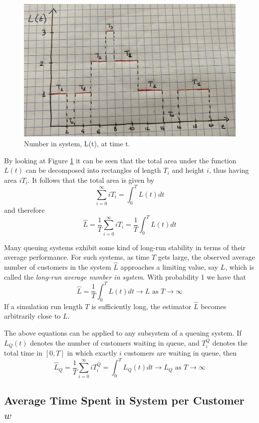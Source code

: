 \documentclass[
]{book}
\begin{document}
\begin{figure}

{\centering \includegraphics[width=0.9\linewidth]{images/system} 

}

\caption{Number in system, L(t), at time t.}\label{fig:system}
\end{figure}

By looking at Figure \ref{fig:system} it can be seen that the total area under the function \(L(t)\) can be decomposed into rectangles of length \(T_i\) and height \(i\), thus having area \(iT_i\). It follows that the total area is given by \[
\sum_{i=0}^{\infty}iT_i = \int_0^TL(t)dt
\]
and therefore
\[
\hat{L}= \frac{1}{T}\sum_{i=0}^{\infty}iT_i=\frac{1}{T}\int_{0}^TL(t)dt
\]

Many queuing systems exhibit some kind of long-run stability in terms of their average performance. For such systems, as time \(T\) gets large, the observed average number of customers in the system \(\hat{L}\) approaches a limiting value, say \(L\), which is called the \emph{long-run average number in system}. With probability 1 we have that
\[
\hat{L}=\frac{1}{T}\int_{0}^TL(t)dt \rightarrow L \mbox{ as } T \rightarrow \infty
\]
If a simulation run length \(T\) is sufficiently long, the estimator \(\hat{L}\) becomes arbitrarily close to \(L\).

The above equations can be applied to any subsystem of a queuing system. If \(L_Q(t)\) denotes the number of customers waiting in queue, and \(T_i^Q\) denotes the total time in \([0,T]\) in which exactly \(i\) customers are waiting in queue, then
\[
\hat{L}_Q=\frac{1}{T}\sum_{i=0}^{\infty}iT_i^Q=\int_0^TL_Q(t)dt \rightarrow L_Q \mbox{ as } T \rightarrow \infty
\]

\hypertarget{average-time-spent-in-system-per-customer-w}{%
\subsection{\texorpdfstring{Average Time Spent in System per Customer \(w\)}{Average Time Spent in System per Customer w}}\label{average-time-spent-in-system-per-customer-w}}
\end{document}
